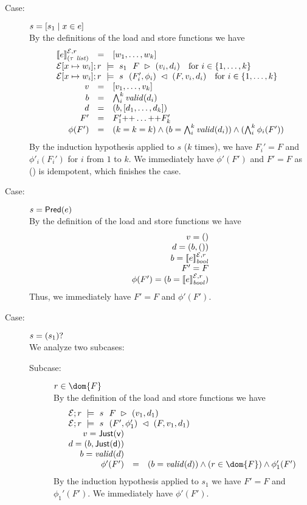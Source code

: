 {\begin{description}
\item[Case:] $s = [ s_1 \mid x \in e ]$\\[1ex]
%
By the definitions of the load and store functions we have 
\[ 
\begin{array}{rcll}
\eval{e}{\Env,r}{(\tau\ \mathit{list})} &=& [w_1,\dots,w_k ]\\
\multicolumn{3}{l}{\load{\Env[ x \mapsto w_i]}{F}{r}{s_1}{v_i,d_i} \quad \text{for}~i \in \{1,\dots,k\}} \\
\multicolumn{3}{l}{\store{\Env[x \mapsto w_i]}{F}{r}{v_i,d_i}{s}{F_i',\phi_i} \quad \text{for}~i \in \{1,\dots,k\}}\\
v &=& [v_1,\dots,v_k]\\
b &= &\bigwedge_i^k \valid{d_i}\\
d &=& (b,[d_1,\dots,d_k])\\
F' &=& F_1' \FAppend \dots \FAppend F_k'\\
\phi(F') &=& (k = k = k) \wedge (b = \bigwedge_i^k \valid{d_i}) \wedge (\bigwedge_i^k \phi_i(F'))\\
\end{array}
\]
By the induction hypothesis applied to $s$ ($k$ times), we have $F_i'
= F$ and $\phi'_i(F_i')$ for $i$ from $1$ to $k$. We immediately have
$\phi'(F')$ and $F' = F$ as (\FAppend) is idempotent, which finishes
the case.

\item[Case:] $s = \mathsf{Pred}(e)$\\[1ex]
%
By the definition of the load and store functions we have
\[
\begin{array}{rcll}
v = ()\\
d = (b,())\\
b = [\![e]\!]^{\mathcal{E},r}_{\mathit{bool}}\\
F' = F\\
\phi(F') = (b = [\![e]\!]^{\mathcal{E},r}_{\mathit{bool}})\\
\end{array}
\]
Thus, we immediately have $F' = F$ and $\phi'(F')$.

\item[Case:] $s = (s_1)?$\\[1ex]
%
We analyze two subcases:
\begin{description}
\item[Subcase:] $r \in \dom{F}$\\[1ex]
%
By the definition of the load and store functions we have
\[ 
\begin{array}{rcll}
\multicolumn{3}{l}{\load{\Env}{F}{r}{s}{v_1,d_1}}\\
\multicolumn{3}{l}{\store{\Env}{F}{r}{v_1,d_1}{s}{ F',\phi_1' }}\\
v = \Just{v}\\
d = (b,\Just{d})\\
b = \valid{d}\\
\phi'(F') &=& (b = \valid{d}) \wedge (r \in \dom{F}) \wedge \phi_1'(F')
\end{array}
\]
%
By the induction hypothesis applied to $s_1$ we have $F' = F$ and
$\phi_1'(F')$. We immediately have $\phi'(F')$.


\end{description}
\end{description}}

